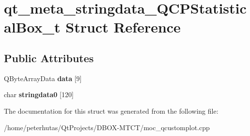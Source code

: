 \hypertarget{structqt__meta__stringdata___q_c_p_statistical_box__t}{}\section{qt\+\_\+meta\+\_\+stringdata\+\_\+\+Q\+C\+P\+Statistical\+Box\+\_\+t Struct Reference}
\label{structqt__meta__stringdata___q_c_p_statistical_box__t}
\subsection*{Public Attributes}
\begin{DoxyCompactItemize}
\item 
\mbox{\label{structqt__meta__stringdata___q_c_p_statistical_box__t_a4da073c461b75439babf89f1a883b091}} 
Q\+Byte\+Array\+Data {\bfseries data} \mbox{[}9\mbox{]}
\item 
\mbox{\label{structqt__meta__stringdata___q_c_p_statistical_box__t_a1cda43a559b6896254cc1ae2ff88fe83}} 
char {\bfseries stringdata0} \mbox{[}120\mbox{]}
\end{DoxyCompactItemize}


The documentation for this struct was generated from the following file\+:\begin{DoxyCompactItemize}
\item 
/home/peterhutas/\+Qt\+Projects/\+D\+B\+O\+X-\/\+M\+T\+C\+T/moc\+\_\+qcustomplot.\+cpp\end{DoxyCompactItemize}
